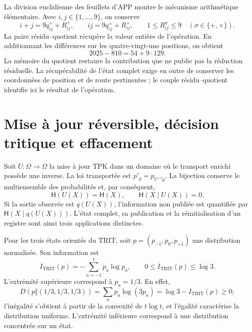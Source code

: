 La division euclidienne des feuillets d'APP montre le mécanisme
arithmétique élémentaire. Avec \(i,j\in\{1,\ldots,9\}\), on conserve
\[
 i+j=9q^+_{ij}+R^+_{ij},\qquad
 ij=9q^\times_{ij}+R^\times_{ij},\qquad
 1\leq R^\sigma_{ij}\leq9\quad(\sigma\in\{+,\times\}).
\]
La paire résidu--quotient récupère la valeur entière de l'opération. En additionnant les différences sur les quatre-vingt-une positions, on obtient
\[
 2025-810=54+9\cdot129.
\]
La mémoire du quotient restaure la contribution que ne publie pas la
réduction résiduelle. La récupérabilité de l'état complet exige
en outre de conserver les coordonnées de position et de route pertinentes ;
le couple résidu--quotient identifie ici le résultat de l'opération.

\section{Mise à jour réversible, décision tritique et effacement}

Soit \(U:\Omega\to\Omega\) la mise à jour TPK dans un domaine où le transport enrichi possède une inverse. La loi transportée est \(p'_y=p_{U^{-1}y}\). La bijection conserve le multiensemble des probabilités et, par conséquent,
\begin{equation}
 \mathsf H(U(X))=\mathsf H(X),\qquad
 \mathsf H(X\mid U(X))=0.
 \label{x_reciprocidad:v:ant:eq:ii-kb-aut-reversible}
\end{equation}
Si la sortie observée est \(q(U(X))\), l'information non publiée
est quantifiée par \(\mathsf H(X\mid q(U(X)))\). L'état complet,
sa publication et la réinitialisation d'un registre sont ainsi trois applications distinctes.

Pour les trois états orientés du TRIT, soit
\(p=(p_{-1},p_0,p_{+1})\) une distribution normalisée. Son information est
\begin{equation}
 I_{\mathrm{TRIT}}(p)=-\sum_{a=-1}^{1}p_a\log p_a,
 \qquad 0\leq I_{\mathrm{TRIT}}(p)\leq\log3.
 \label{x_reciprocidad:v:ant:eq:ii-kb-aut-trit}
\end{equation}
L'extrémité supérieure correspond à \(p_a=1/3\). En effet,
\[
 D(p\Vert(1/3,1/3,1/3))
 =\sum_ap_a\log(3p_a)=\log3-I_{\mathrm{TRIT}}(p)\geq0;
\]
l'inégalité s'obtient à partir de la convexité de \(t\log t\), et l'égalité caractérise la distribution uniforme. L'extrémité inférieure correspond à une distribution concentrée sur un état.

